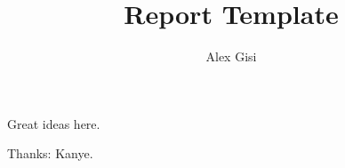 \documentclass[11pt]{article}
\title{\vspace{-1cm}Report Template}
\author{Alex Gisi}
\begin{document}
\maketitle

Great ideas here.

\vspace{10mm}
\noindent Thanks: Kanye.
\end{document}
